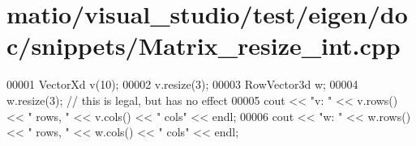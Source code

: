 \hypertarget{matio_2visual__studio_2test_2eigen_2doc_2snippets_2_matrix__resize__int_8cpp_source}{}\section{matio/visual\+\_\+studio/test/eigen/doc/snippets/\+Matrix\+\_\+resize\+\_\+int.cpp}
\label{matio_2visual__studio_2test_2eigen_2doc_2snippets_2_matrix__resize__int_8cpp_source}

\begin{DoxyCode}
00001 VectorXd v(10);
00002 v.resize(3);
00003 RowVector3d w;
00004 w.resize(3); \textcolor{comment}{// this is legal, but has no effect}
00005 cout << \textcolor{stringliteral}{"v: "} << v.rows() << \textcolor{stringliteral}{" rows, "} << v.cols() << \textcolor{stringliteral}{" cols"} << endl;
00006 cout << \textcolor{stringliteral}{"w: "} << w.rows() << \textcolor{stringliteral}{" rows, "} << w.cols() << \textcolor{stringliteral}{" cols"} << endl;
\end{DoxyCode}
